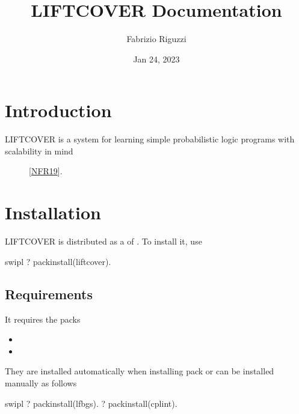 \documentclass[letterpaper,10pt,english]{sphinxmanual}
\title{LIFTCOVER Documentation}
\date{Jan 24, 2023}
\author{Fabrizio Riguzzi}
\begin{document}
\pagestyle{empty}
\sphinxmaketitle
\pagestyle{plain}
\sphinxtableofcontents
\pagestyle{normal}
\label{\detokenize{index::doc}}



\chapter{Introduction}
\label{\detokenize{index:introduction}}\begin{description}
\item[{LIFTCOVER is a system for learning simple probabilistic logic programs with scalability in mind}] \leavevmode
\sphinxAtStartPar
{[}\hyperlink{cite.index:id33}{NFR19}{]}.

\end{description}


\chapter{Installation}
\label{\detokenize{index:installation}}
\sphinxAtStartPar
LIFTCOVER is distributed as a  of .
To install it, use

\begin{sphinxVerbatim}[commandchars=\\\{\}]
\PYGZdl{} swipl
?\PYGZhy{} pack\PYGZus{}install(liftcover).
\end{sphinxVerbatim}


\section{Requirements}
\label{\detokenize{index:requirements}}
\sphinxAtStartPar
It requires the packs
\begin{itemize}
\item {} 
\sphinxAtStartPar
{}

\item {} 
\sphinxAtStartPar
{}

\end{itemize}

\sphinxAtStartPar
They are installed automatically when installing pack  or can be installed manually as follows

\begin{sphinxVerbatim}[commandchars=\\\{\}]
\PYGZdl{} swipl
?\PYGZhy{} pack\PYGZus{}install(lfbgs).
?\PYGZhy{} pack\PYGZus{}install(cplint).
\end{sphinxVerbatim}
\end{document}
